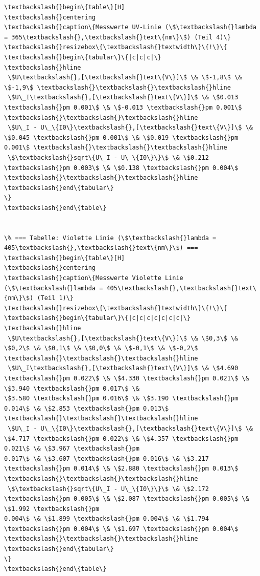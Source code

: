 \begin{Verbatim}[commandchars=\\\{\}]
\textbackslash{}begin\{table\}[H]
\textbackslash{}centering
\textbackslash{}caption\{Messwerte UV-Linie (\$\textbackslash{}lambda = 365\textbackslash{},\textbackslash{}text\{nm\}\$) (Teil 4)\}
\textbackslash{}resizebox\{\textbackslash{}textwidth\}\{!\}\{
\textbackslash{}begin\{tabular\}\{|c|c|c|\}
\textbackslash{}hline
 \$U\textbackslash{},[\textbackslash{}text\{V\}]\$ \& \$-1,8\$ \& \$-1,9\$ \textbackslash{}\textbackslash{}\textbackslash{}hline
 \$U\_I\textbackslash{},[\textbackslash{}text\{V\}]\$ \& \$0.013 \textbackslash{}pm 0.001\$ \& \$-0.013 \textbackslash{}pm 0.001\$ \textbackslash{}\textbackslash{}\textbackslash{}hline
 \$U\_I - U\_\{I0\}\textbackslash{},[\textbackslash{}text\{V\}]\$ \& \$0.045 \textbackslash{}pm 0.001\$ \& \$0.019 \textbackslash{}pm 0.001\$ \textbackslash{}\textbackslash{}\textbackslash{}hline
 \$\textbackslash{}sqrt\{U\_I - U\_\{I0\}\}\$ \& \$0.212 \textbackslash{}pm 0.003\$ \& \$0.138 \textbackslash{}pm 0.004\$ \textbackslash{}\textbackslash{}\textbackslash{}hline
\textbackslash{}end\{tabular\}
\}
\textbackslash{}end\{table\}


\% === Tabelle: Violette Linie (\$\textbackslash{}lambda = 405\textbackslash{},\textbackslash{}text\{nm\}\$) ===
\textbackslash{}begin\{table\}[H]
\textbackslash{}centering
\textbackslash{}caption\{Messwerte Violette Linie (\$\textbackslash{}lambda = 405\textbackslash{},\textbackslash{}text\{nm\}\$) (Teil 1)\}
\textbackslash{}resizebox\{\textbackslash{}textwidth\}\{!\}\{
\textbackslash{}begin\{tabular\}\{|c|c|c|c|c|c|c|\}
\textbackslash{}hline
 \$U\textbackslash{},[\textbackslash{}text\{V\}]\$ \& \$0,3\$ \& \$0,2\$ \& \$0,1\$ \& \$0,0\$ \& \$-0,1\$ \& \$-0,2\$ \textbackslash{}\textbackslash{}\textbackslash{}hline
 \$U\_I\textbackslash{},[\textbackslash{}text\{V\}]\$ \& \$4.690 \textbackslash{}pm 0.022\$ \& \$4.330 \textbackslash{}pm 0.021\$ \& \$3.940 \textbackslash{}pm 0.017\$ \&
\$3.580 \textbackslash{}pm 0.016\$ \& \$3.190 \textbackslash{}pm 0.014\$ \& \$2.853 \textbackslash{}pm 0.013\$ \textbackslash{}\textbackslash{}\textbackslash{}hline
 \$U\_I - U\_\{I0\}\textbackslash{},[\textbackslash{}text\{V\}]\$ \& \$4.717 \textbackslash{}pm 0.022\$ \& \$4.357 \textbackslash{}pm 0.021\$ \& \$3.967 \textbackslash{}pm
0.017\$ \& \$3.607 \textbackslash{}pm 0.016\$ \& \$3.217 \textbackslash{}pm 0.014\$ \& \$2.880 \textbackslash{}pm 0.013\$ \textbackslash{}\textbackslash{}\textbackslash{}hline
 \$\textbackslash{}sqrt\{U\_I - U\_\{I0\}\}\$ \& \$2.172 \textbackslash{}pm 0.005\$ \& \$2.087 \textbackslash{}pm 0.005\$ \& \$1.992 \textbackslash{}pm
0.004\$ \& \$1.899 \textbackslash{}pm 0.004\$ \& \$1.794 \textbackslash{}pm 0.004\$ \& \$1.697 \textbackslash{}pm 0.004\$ \textbackslash{}\textbackslash{}\textbackslash{}hline
\textbackslash{}end\{tabular\}
\}
\textbackslash{}end\{table\}


\end{Verbatim}
